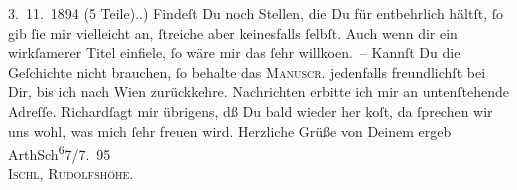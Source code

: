 \begin{ledgroupsized}[t]{13cm}
{{{                        3. 11. 1894 (5 Teile).}}}\label{K_L00463_1h}.) Findeſt Du noch Stellen,
               die Du für entbehrlich hältſt, ſo gib ſie mir vielleicht an, ſtreiche aber
               keinesfalls ſelbſt. {\pb}Auch wenn dir ein wirkſamerer Titel einfiele, ſo wäre mir das ſehr willko{\geminationm}en. –\pend
           \pstart
           Kannſt Du die Geſchichte nicht brauchen, ſo behalte das \textsc{Manuscr}. jedenfalls freundlichſt bei Dir, bis ich nach Wien zurückkehre. Nachrichten erbitte ich mir an untenſtehende
               Adreſſe. Richardſagt mir übrigens, dß Du bald
                  {\pb}wieder her ko{\geminationm}ſt, da ſprechen wir uns wohl, was mich ſehr freuen
               wird.\pend
           \pstart Herzliche Grüße von Deinem ergeb \spacefill\mbox{ArthSch}\pend{}\substVorne{}\textsuperscript{6}\substDazwischen{}7\substHinten{}/7. 95{\\}\textsc{Ischl, Rudolfshöhe.}\pend
           
         
         \endnumbering{}\end{ledgroupsized}  \newcommand{\dateiname}{L00463}\newcommand{\titel}{Arthur Schnitzler an Hermann Bahr, 17. 7. 1895}\newcommand{\editorInnen}{ Kurt Ifkovits,  Martin Anton Müller}
      